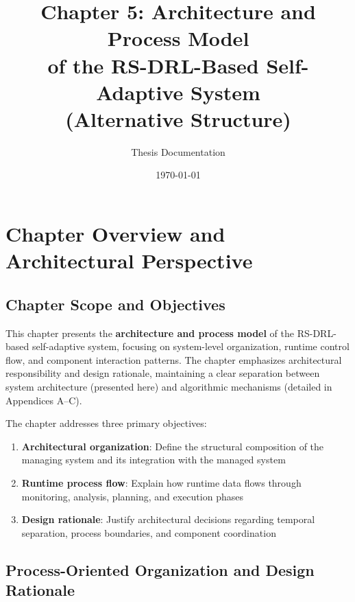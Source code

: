 \documentclass[11pt,a4paper]{article}
\title{Chapter 5: Architecture and Process Model\\of the RS-DRL-Based Self-Adaptive System\\(Alternative Structure)}
\author{Thesis Documentation}
\date{\today}
\begin{document}
\maketitle

\tableofcontents
\newpage


\section{Chapter Overview and Architectural Perspective}
\label{sec:overview}

\subsection{Chapter Scope and Objectives}
\label{subsec:scope}

This chapter presents the \textbf{architecture and process model} of the RS-DRL-based self-adaptive system, focusing on system-level organization, runtime control flow, and component interaction patterns. The chapter emphasizes architectural responsibility and design rationale, maintaining a clear separation between system architecture (presented here) and algorithmic mechanisms (detailed in Appendices A--C).

The chapter addresses three primary objectives:

\begin{enumerate}
    \item \textbf{Architectural organization}: Define the structural composition of the managing system and its integration with the managed system
    \item \textbf{Runtime process flow}: Explain how runtime data flows through monitoring, analysis, planning, and execution phases
    \item \textbf{Design rationale}: Justify architectural decisions regarding temporal separation, process boundaries, and component coordination
\end{enumerate}

\subsection{Process-Oriented Organization and Design Rationale}
\label{subsec:organization}
\end{document}
